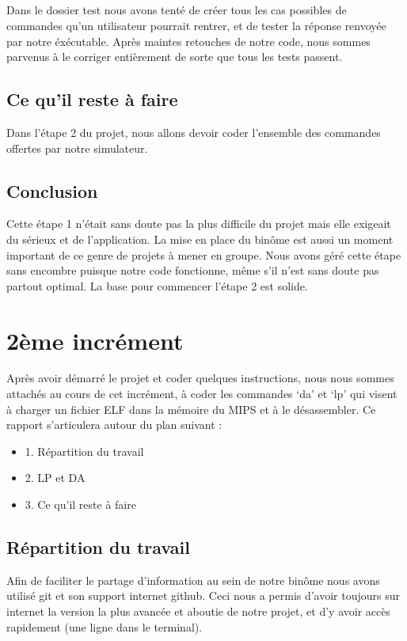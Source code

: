 \documentclass[10pt,a4paper]{report}
\begin{document}
\paragraph{}
Dans le dossier test nous avons tenté de créer tous les cas possibles de commandes qu'un utilisateur pourrait rentrer, et de tester la réponse renvoyée par notre éxécutable. Après maintes retouches de notre code, nous sommes parvenus à le corriger entièrement de sorte que tous les tests passent.

\section{Ce qu'il reste à faire}	

Dans l'étape 2 du projet, nous allons devoir coder l'ensemble des commandes offertes par notre simulateur.

	
\section{Conclusion}

Cette étape 1 n'était sans doute pas la plus difficile du projet mais elle exigeait du sérieux et de l'application. La mise en place du binôme est aussi un moment important de ce genre de projets à mener en groupe. Nous avons géré cette étape sans encombre puisque notre code fonctionne, même s'il n'est sans doute pas partout optimal. La base pour commencer l'étape 2 est solide.


\chapter{2ème incrément}

Après avoir démarré le projet et coder quelques instructions, nous nous sommes attachés au cours de cet incrément, à coder les commandes ‘da’ et ‘lp’ qui visent à charger un fichier ELF dans la mémoire du MIPS et à le désassembler.
\newline
	Ce rapport s'articulera autour du plan suivant :
\begin{itemize}
  	\item1. Répartition du travail
	\item 2. LP et DA
	\item 3. Ce qu'il reste à faire
\end{itemize}
	
	
\section{Répartition du travail}
 Afin de faciliter le partage d’information au sein de notre binôme nous avons utilisé git et son support internet github. Ceci nous a permis d’avoir toujours sur internet la version la plus avancée et aboutie de notre projet, et d’y avoir accès rapidement (une ligne dans le terminal).
\end{document}
